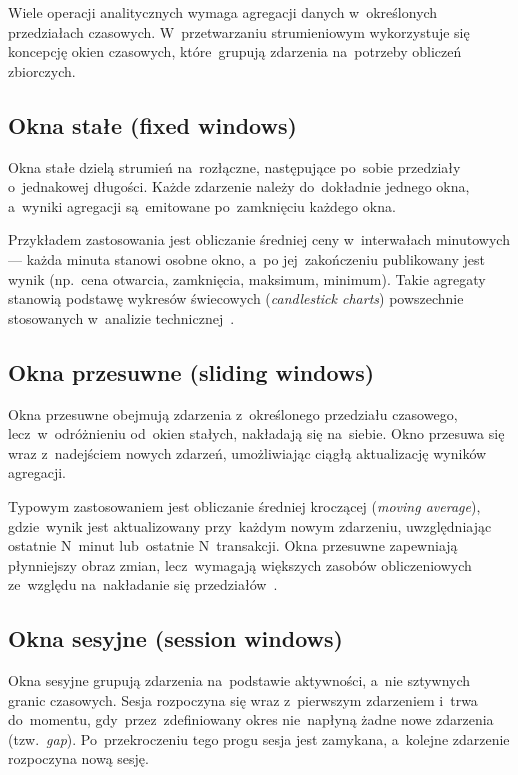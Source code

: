 Wiele operacji analitycznych wymaga agregacji danych w~określonych przedziałach czasowych.
W~przetwarzaniu strumieniowym wykorzystuje się koncepcję okien czasowych, które~grupują zdarzenia na~potrzeby obliczeń zbiorczych.

\subsection{Okna stałe (fixed windows)}
\label{subsec:fixed_windows}

Okna stałe dzielą strumień na~rozłączne, następujące po~sobie przedziały o~jednakowej długości.
Każde zdarzenie należy do~dokładnie jednego okna, a~wyniki agregacji są~emitowane po~zamknięciu każdego okna.

Przykładem zastosowania jest obliczanie średniej ceny w~interwałach minutowych --- każda minuta stanowi osobne okno,
a~po jej~zakończeniu publikowany jest wynik (np.~cena otwarcia, zamknięcia, maksimum, minimum).
Takie agregaty stanowią podstawę wykresów świecowych (\textit{candlestick charts}) powszechnie stosowanych
w~analizie technicznej~\cite{dataflow_model}.

\subsection{Okna przesuwne (sliding windows)}
\label{subsec:sliding_windows}

Okna przesuwne obejmują zdarzenia z~określonego przedziału czasowego, lecz~w~odróżnieniu od~okien stałych,
nakładają się na~siebie.
Okno przesuwa się wraz z~nadejściem nowych zdarzeń, umożliwiając ciągłą aktualizację wyników agregacji.

Typowym zastosowaniem jest obliczanie średniej kroczącej (\textit{moving average}), gdzie~wynik jest aktualizowany
przy~każdym nowym zdarzeniu, uwzględniając ostatnie N~minut lub~ostatnie N~transakcji.
Okna przesuwne zapewniają płynniejszy obraz zmian, lecz~wymagają większych zasobów obliczeniowych ze~względu
na~nakładanie się przedziałów~\cite{dataflow_model}.

\subsection{Okna sesyjne (session windows)}
\label{subsec:session_windows}

Okna sesyjne grupują zdarzenia na~podstawie aktywności, a~nie sztywnych granic czasowych.
Sesja rozpoczyna się wraz z~pierwszym zdarzeniem i~trwa do~momentu, gdy~przez~zdefiniowany okres nie~napłyną żadne
nowe zdarzenia (tzw.~\textit{gap}).
Po~przekroczeniu tego progu sesja jest zamykana, a~kolejne zdarzenie rozpoczyna nową sesję.

